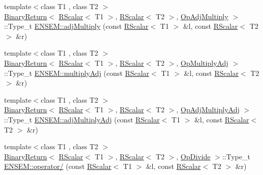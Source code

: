 \begin{DoxyCompactItemize}
\item 
{\footnotesize template$<$class T1 , class T2 $>$ }\\\mbox{\hyperlink{structENSEM_1_1BinaryReturn}{Binary\+Return}}$<$ \mbox{\hyperlink{classENSEM_1_1RScalar}{R\+Scalar}}$<$ T1 $>$, \mbox{\hyperlink{classENSEM_1_1RScalar}{R\+Scalar}}$<$ T2 $>$, \mbox{\hyperlink{structENSEM_1_1OpAdjMultiply}{Op\+Adj\+Multiply}} $>$\+::Type\+\_\+t \mbox{\hyperlink{group__rscalar_gaed3e42d4304edfd5a3838b8b1b559e37}{E\+N\+S\+E\+M\+::adj\+Multiply}} (const \mbox{\hyperlink{classENSEM_1_1RScalar}{R\+Scalar}}$<$ T1 $>$ \&l, const \mbox{\hyperlink{classENSEM_1_1RScalar}{R\+Scalar}}$<$ T2 $>$ \&r)
\item 
{\footnotesize template$<$class T1 , class T2 $>$ }\\\mbox{\hyperlink{structENSEM_1_1BinaryReturn}{Binary\+Return}}$<$ \mbox{\hyperlink{classENSEM_1_1RScalar}{R\+Scalar}}$<$ T1 $>$, \mbox{\hyperlink{classENSEM_1_1RScalar}{R\+Scalar}}$<$ T2 $>$, \mbox{\hyperlink{structENSEM_1_1OpMultiplyAdj}{Op\+Multiply\+Adj}} $>$\+::Type\+\_\+t \mbox{\hyperlink{group__rscalar_ga5b26c70325ac5d320cfd53d629b3d0c4}{E\+N\+S\+E\+M\+::multiply\+Adj}} (const \mbox{\hyperlink{classENSEM_1_1RScalar}{R\+Scalar}}$<$ T1 $>$ \&l, const \mbox{\hyperlink{classENSEM_1_1RScalar}{R\+Scalar}}$<$ T2 $>$ \&r)
\item 
{\footnotesize template$<$class T1 , class T2 $>$ }\\\mbox{\hyperlink{structENSEM_1_1BinaryReturn}{Binary\+Return}}$<$ \mbox{\hyperlink{classENSEM_1_1RScalar}{R\+Scalar}}$<$ T1 $>$, \mbox{\hyperlink{classENSEM_1_1RScalar}{R\+Scalar}}$<$ T2 $>$, \mbox{\hyperlink{structENSEM_1_1OpAdjMultiplyAdj}{Op\+Adj\+Multiply\+Adj}} $>$\+::Type\+\_\+t \mbox{\hyperlink{group__rscalar_ga98ba0296fc190036d2587357efbd8ca2}{E\+N\+S\+E\+M\+::adj\+Multiply\+Adj}} (const \mbox{\hyperlink{classENSEM_1_1RScalar}{R\+Scalar}}$<$ T1 $>$ \&l, const \mbox{\hyperlink{classENSEM_1_1RScalar}{R\+Scalar}}$<$ T2 $>$ \&r)
\item 
{\footnotesize template$<$class T1 , class T2 $>$ }\\\mbox{\hyperlink{structENSEM_1_1BinaryReturn}{Binary\+Return}}$<$ \mbox{\hyperlink{classENSEM_1_1RScalar}{R\+Scalar}}$<$ T1 $>$, \mbox{\hyperlink{classENSEM_1_1RScalar}{R\+Scalar}}$<$ T2 $>$, \mbox{\hyperlink{structENSEM_1_1OpDivide}{Op\+Divide}} $>$\+::Type\+\_\+t \mbox{\hyperlink{group__rscalar_ga152c5f3a8197a5f6804ad19fc8987ed2}{E\+N\+S\+E\+M\+::operator/}} (const \mbox{\hyperlink{classENSEM_1_1RScalar}{R\+Scalar}}$<$ T1 $>$ \&l, const \mbox{\hyperlink{classENSEM_1_1RScalar}{R\+Scalar}}$<$ T2 $>$ \&r)

\end{DoxyCompactItemize}
